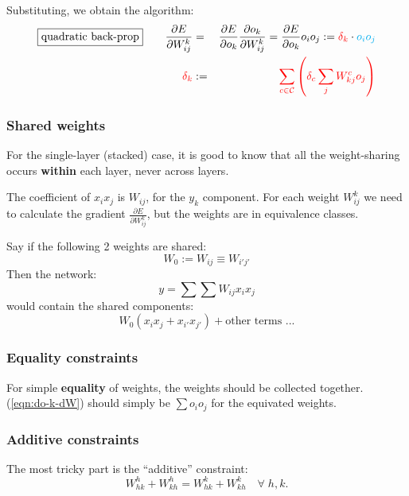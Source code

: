 Substituting, we obtain the algorithm:
\begin{eqnarray}
\boxed{\mbox{quadratic back-prop}} \quad \quad
\frac{\partial E}{\partial W_{ij}^k}
&=& \frac{\partial E}{\partial o_k} \frac{\partial o_k}{\partial W_{ij}^k}
= \frac{\partial E}{\partial o_k} o_i o_j := {\color{red} \delta_k} \cdot {\color{cyan} o_i o_j} \nonumber \\ 
{\color{red} \delta_k} &:=& {\color{red} \sum_{c \in \mathcal{C}} \left( \delta_c \sum_j W_{kj}^c o_j \right)}
\end{eqnarray}

\subsubsection{Shared weights}

For the single-layer (stacked) case, it is good to know that all the weight-sharing occurs \textbf{within} each layer, never across layers.

The coefficient of $x_i x_j$ is $W_{i j}$, for the $y_k$ component.  For each weight $W_{ij}^k$ we need to calculate the gradient $\displaystyle \frac{\partial E}{\partial W_{ij}^k}$, but the weights are in equivalence classes.

Say if the following 2 weights are shared:
\begin{equation}
W_0 := W_{i j} \equiv W_{i' j'}
\end{equation}
Then the network:
\begin{equation}
y = \sum \sum W_{ij} x_i x_j
\end{equation}
would contain the shared components:
\begin{equation}
W_0 ( x_i x_j + x_{i'} x_{j'} ) + \mbox{other terms ...}
\end{equation}

\subsubsection{Equality constraints}

For simple \textbf{equality} of weights, the weights should be collected together.  (\ref{eqn:do-k-dW}) should simply be $\sum o_i o_j$ for the equivated weights.

\subsubsection{Additive constraints}

The most tricky part is the ``additive'' constraint:
\begin{equation}
W_{hk}^h + W_{kh}^h = W_{hk}^k + W_{kh}^k \quad \forall \; h,k .
\end{equation}

